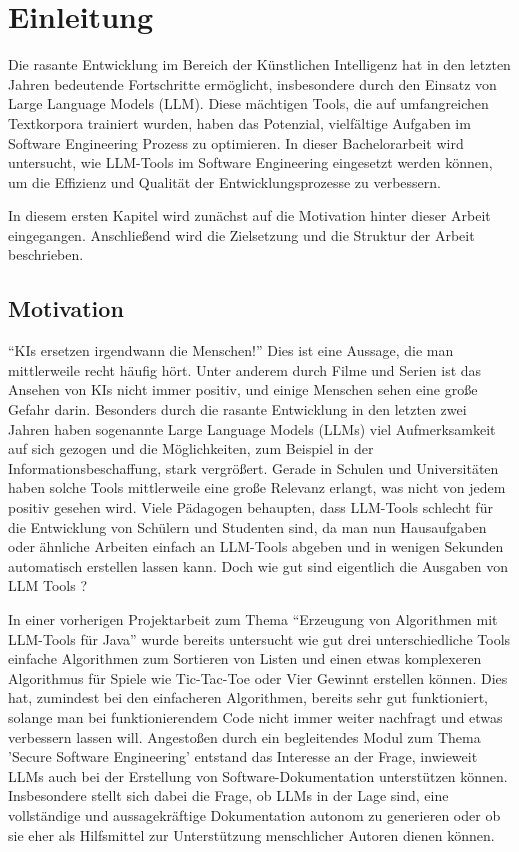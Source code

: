 
\chapter{Einleitung} 

Die rasante Entwicklung im Bereich der Künstlichen Intelligenz hat in den letzten Jahren bedeutende Fortschritte ermöglicht, 
insbesondere durch den Einsatz von Large Language Models (LLM). Diese mächtigen Tools, die auf umfangreichen Textkorpora 
trainiert wurden, haben das Potenzial, vielfältige Aufgaben im Software Engineering Prozess zu optimieren. 
In dieser Bachelorarbeit wird untersucht, wie LLM-Tools im Software Engineering eingesetzt werden können, um die Effizienz und 
Qualität der Entwicklungsprozesse zu verbessern.

In diesem ersten Kapitel wird zunächst auf die Motivation hinter dieser Arbeit eingegangen. Anschließend wird die Zielsetzung 
und die Struktur der Arbeit beschrieben.

\section{Motivation}  \label{Motivation}

``KIs ersetzen irgendwann die Menschen!'' Dies ist eine Aussage, die man mittlerweile recht häufig hört. Unter anderem durch Filme 
und Serien ist das Ansehen von KIs nicht immer positiv, und einige Menschen sehen eine große Gefahr darin. Besonders durch die 
rasante Entwicklung in den letzten zwei Jahren haben sogenannte Large Language Models (LLMs) viel Aufmerksamkeit auf sich gezogen 
und die Möglichkeiten, zum Beispiel in der Informationsbeschaffung, stark vergrößert. Gerade in Schulen und Universitäten haben 
solche Tools mittlerweile eine große Relevanz erlangt, was nicht von jedem positiv gesehen wird. Viele Pädagogen behaupten, dass 
LLM-Tools schlecht für die Entwicklung von Schülern und Studenten sind, da man nun Hausaufgaben oder ähnliche Arbeiten einfach an 
LLM-Tools abgeben und in wenigen Sekunden automatisch erstellen lassen kann. Doch wie gut sind eigentlich die Ausgaben von LLM Tools 
\cite{KIInDerSchule}?

In einer vorherigen Projektarbeit zum Thema ``Erzeugung von Algorithmen mit LLM-Tools für Java'' wurde bereits untersucht 
wie gut drei unterschiedliche Tools einfache Algorithmen zum Sortieren von Listen und einen etwas komplexeren Algorithmus 
für Spiele wie Tic-Tac-Toe oder Vier Gewinnt erstellen können. Dies hat, zumindest bei den einfacheren Algorithmen, bereits 
sehr gut funktioniert, solange man bei funktionierendem Code nicht immer weiter nachfragt und etwas verbessern lassen will.
Angestoßen durch ein begleitendes Modul zum Thema 'Secure Software Engineering' entstand das Interesse an der Frage, inwieweit 
LLMs auch bei der Erstellung von Software-Dokumentation unterstützen können. Insbesondere stellt sich dabei die Frage, ob LLMs 
in der Lage sind, eine vollständige und aussagekräftige Dokumentation autonom zu generieren oder ob sie eher als Hilfsmittel zur 
Unterstützung menschlicher Autoren dienen können.

